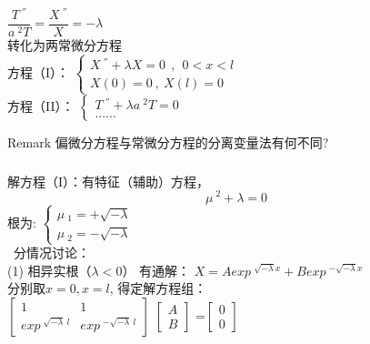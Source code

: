 \begin{frame}
	\frametitle{}	
	$ \dfrac{T~^{''}}{a~^2 T}=\dfrac{X~^{''} }{X} =-\lambda $ \\ \vspace{0.3cm}
	转化为两常微分方程 \\ \vspace{0.3cm}
	方程（I）：
	$\displaystyle  \begin{cases}
		X~^{''} +\lambda X=0  ~~,~~ 0<x<l\\
		X(0)=0 ~,~X(l)=0
	\end{cases}$ \\	
	方程（II）：
	$\displaystyle  \begin{cases}
		T~^{''} +\lambda {a~^2 T}=0 \\
		......
	\end{cases}$ \\	
	\begin{block} {Remark}
		偏微分方程与常微分方程的分离变量法有何不同?
	\end{block}
\end{frame}	

\begin{frame}
	\frametitle{}	
	解方程（I）：有特征（辅助）方程， 
	\begin{equation*}
		\mu~^2 +\lambda =0
	\end{equation*}
	根为:
	$\displaystyle  \begin{cases}
		\mu~_1=+\sqrt{-\lambda}\\
		\mu~_2=-\sqrt{-\lambda}
	\end{cases}$ \\	\vspace{0.6 em}	
	{\Bullet}~分情况讨论：\\
	(1) 相异实根（$\lambda < 0$）
	有通解：	{ $\displaystyle 	X=Aexp~^{\sqrt{-\lambda}x} + Bexp~^{-\sqrt{-\lambda}x} $ } \\ 
	分别取$x=0, x=l$, 得定解方程组：\\
	$\left[
	\begin{array}{lll}
		1&1\\
		exp~^{\sqrt{-\lambda}~l} &exp~^{-\sqrt{-\lambda}~l}
	\end{array}
	\right]$
	$\left[
	\begin{array}{ll}
		A\\
		B
	\end{array}
	\right]$
	=$\left[
	\begin{array}{ll}
		0\\
		0
	\end{array}
	\right]$
\end{frame}	

